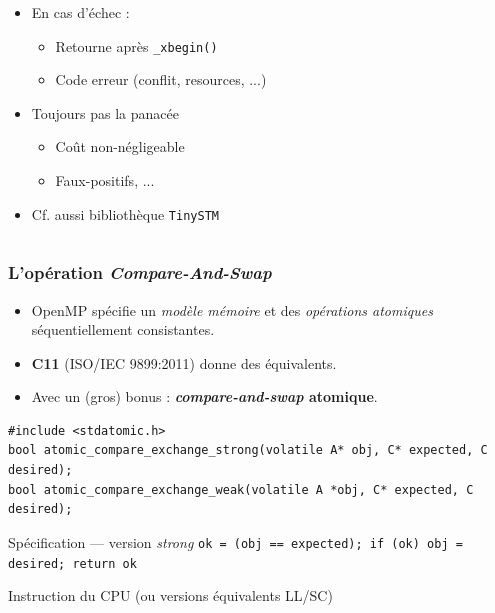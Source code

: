 \documentclass[xcolor={x11names,svgnames}]{beamer}
\begin{document}
\begin{frame}[fragile, label=rtm]
\begin{columns}
\begin{column}{0.63\textwidth}
\begin{itemize}
    \medskip

  \item \alert{En cas d'échec} :
    \begin{itemize}
    \item Retourne après \verb|_xbegin()|
    \item Code erreur (conflit, resources, ...)
    \end{itemize}

    \medskip

  \item Toujours pas la panacée
    \begin{itemize}
    \item Coût non-négligeable
    \item Faux-positifs, ...
    \end{itemize}

    \medskip

  \item Cf. aussi bibliothèque \texttt{TinySTM}
  \end{itemize}
\end{column}
\end{columns}
\end{frame}


\begin{frame}[fragile, label=CAS]
  \frametitle{L'opération \emph{Compare-And-Swap}}

  \small
  \begin{itemize}
  \item OpenMP spécifie un \emph{modèle mémoire} et des \emph{opérations
      atomiques} séquentiellement consistantes.
  \item \textbf{C11} (ISO/IEC 9899:2011) donne des équivalents.
  \item Avec un (gros) bonus : \textbf{\emph{compare-and-swap} \alert{atomique}}.
  \end{itemize}

\medskip
  
\begin{verbatim}
#include <stdatomic.h>
bool atomic_compare_exchange_strong(volatile A* obj, C* expected, C desired);
bool atomic_compare_exchange_weak(volatile A *obj, C* expected, C desired);
\end{verbatim}

\medskip

\begin{block}{Spécification --- version \emph{strong}}
  \texttt{ok = (obj == expected); if (ok) obj = desired; return ok}%
\end{block}

\medskip Instruction du CPU (ou versions équivalents LL/SC)
\end{frame}
\end{document}
